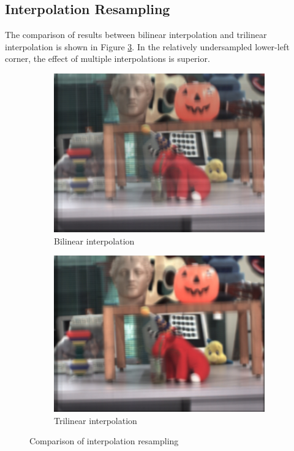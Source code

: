 \documentclass{article}
\begin{document}
\subsection{Interpolation Resampling}
The comparison of results between bilinear interpolation and trilinear interpolation is shown in Figure \ref{fig:interpolation}. In the relatively undersampled lower-left corner, the effect of multiple interpolations is superior.

\begin{figure}[htbp]
    \centering
    \begin{subfigure}{0.35\textwidth}
        \centering
        \includegraphics[width=\textwidth]{interp_2.png} %
        \caption{Bilinear interpolation}
        \label{fig:bilinear}
    \end{subfigure}%
    \begin{subfigure}{0.35\textwidth}
        \centering
        \includegraphics[width=\textwidth]{interp_4.png} %
        \caption{Trilinear interpolation}
        \label{fig:trilinear}
    \end{subfigure}
    \caption{Comparison of interpolation resampling}
    \label{fig:interpolation}
\end{figure}
\end{document}
